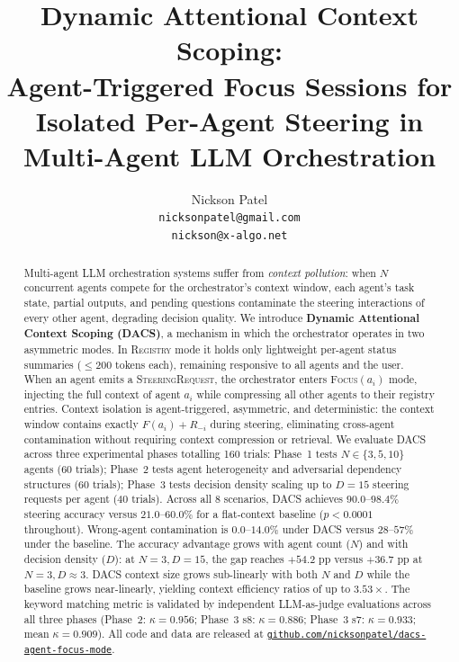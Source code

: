 \documentclass{article}
\title{Dynamic Attentional Context Scoping:\\
Agent-Triggered Focus Sessions for\\
Isolated Per-Agent Steering in Multi-Agent LLM Orchestration}
\author{%
  Nickson Patel \\
  \texttt{nicksonpatel@gmail.com} \\
  \texttt{nickson@x-algo.net}
}
\begin{document}
\maketitle

\begin{abstract}
Multi-agent LLM orchestration systems suffer from \emph{context pollution}:
when $N$ concurrent agents compete for the orchestrator's context window,
each agent's task state, partial outputs, and pending questions contaminate
the steering interactions of every other agent, degrading decision quality.
We introduce \textbf{Dynamic Attentional Context Scoping (DACS)}, a
mechanism in which the orchestrator operates in two asymmetric modes.
In \textsc{Registry} mode it holds only lightweight per-agent status
summaries ($\leq 200$ tokens each), remaining responsive to all agents
and the user.
When an agent emits a \textsc{SteeringRequest}, the orchestrator enters
\textsc{Focus}$(a_i)$ mode, injecting the full context of agent $a_i$
while compressing all other agents to their registry entries.
Context isolation is agent-triggered, asymmetric, and deterministic:
the context window contains exactly $F(a_i) + R_{-i}$ during steering,
eliminating cross-agent contamination without requiring context
compression or retrieval.
We evaluate DACS across three experimental phases totalling 160 trials:
Phase~1 tests $N \in \{3,5,10\}$ agents (60 trials);
Phase~2 tests agent heterogeneity and adversarial dependency structures
(60 trials);
Phase~3 tests decision density scaling up to $D=15$ steering requests per
agent (40 trials).
Across all 8 scenarios, DACS achieves $90.0$--$98.4\%$ steering accuracy
versus $21.0$--$60.0\%$ for a flat-context baseline ($p < 0.0001$
throughout).
Wrong-agent contamination is $0.0$--$14.0\%$ under DACS versus
$28$--$57\%$ under the baseline.
The accuracy advantage grows with agent count ($N$) and with
decision density ($D$): at $N=3, D=15$, the gap reaches $+54.2$ pp
versus $+36.7$ pp at $N=3, D\approx3$.
DACS context size grows sub-linearly with both $N$ and $D$ while the
baseline grows near-linearly, yielding context efficiency ratios of
up to $3.53\times$.
The keyword matching metric is validated by independent LLM-as-judge
evaluations across all three phases (Phase~2: $\kappa=0.956$;
Phase~3 s8: $\kappa=0.886$; Phase~3 s7: $\kappa=0.933$;
mean $\kappa=0.909$).
All code and data are released at
\href{https://github.com/nicksonpatel/dacs-agent-focus-mode}{\texttt{github.com/nicksonpatel/dacs-agent-focus-mode}}.
\end{abstract}
\end{document}
